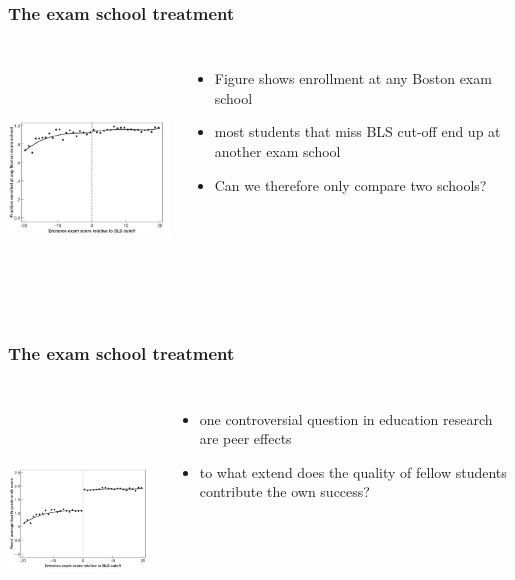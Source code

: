 \documentclass{beamer}
\begin{document}
\begin{frame}
\frametitle{The exam school treatment}
\begin{columns}
\includegraphics[width=6cm,height=6.5cm,keepaspectratio]{Figure 4.7} 

\begin{itemize}
	\item Figure shows enrollment at any Boston exam school
	\item most students that miss BLS cut-off end up at another exam school
	\item Can we therefore only compare two schools?
	
\end{itemize}
\end{columns}	
\end{frame}
\begin{frame}
\frametitle{The exam school treatment}
\begin{columns}
\includegraphics[width=6cm,height=6.5cm,keepaspectratio]{Figure 4.8} 

\begin{itemize}
	\item one controversial question in education research are peer effects
	\item to what extend does the quality of fellow students contribute the own success?
	
\end{itemize}
\end{columns}	
\end{frame}
\end{document}
